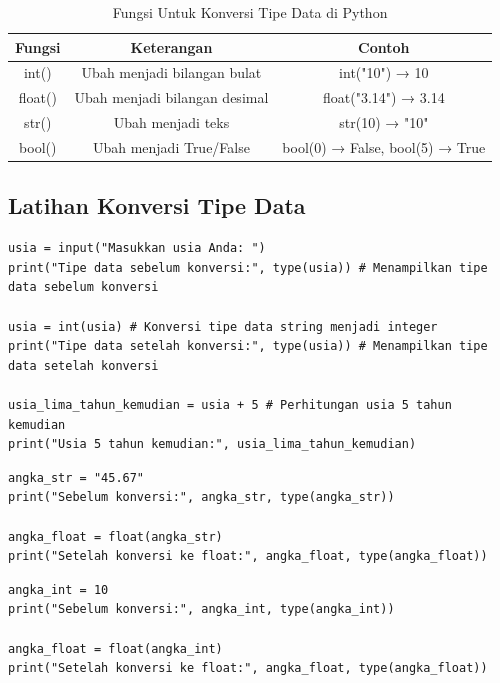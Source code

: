 \begin{table}[h!]
\centering
\begin{tabular}{|c|c|c|}
\hline
\textbf{Fungsi} & \textbf{Keterangan} & \textbf{Contoh} \\
\hline
int() & Ubah menjadi bilangan bulat & int("10") → 10 \\
\hline
float() & Ubah menjadi bilangan desimal & float("3.14") → 3.14 \\
\hline
str() & Ubah menjadi teks & str(10) → "10" \\
\hline
bool() & Ubah menjadi True/False & bool(0) → False, bool(5) → True \\
\hline
\end{tabular}
\caption{Fungsi Untuk Konversi Tipe Data di Python}
\end{table}

\subsection{Latihan Konversi Tipe Data}

\begin{lstlisting}[style=PythonStyle, caption={Kode Python: string_to_int.py}]
usia = input("Masukkan usia Anda: ")
print("Tipe data sebelum konversi:", type(usia)) # Menampilkan tipe data sebelum konversi

usia = int(usia) # Konversi tipe data string menjadi integer
print("Tipe data setelah konversi:", type(usia)) # Menampilkan tipe data setelah konversi

usia_lima_tahun_kemudian = usia + 5 # Perhitungan usia 5 tahun kemudian
print("Usia 5 tahun kemudian:", usia_lima_tahun_kemudian)
\end{lstlisting}

\begin{lstlisting}[style=PythonStyle, caption={Kode Python: string_to_float.py}]
angka_str = "45.67"
print("Sebelum konversi:", angka_str, type(angka_str))

angka_float = float(angka_str)
print("Setelah konversi ke float:", angka_float, type(angka_float))
\end{lstlisting}

\begin{lstlisting}[style=PythonStyle, caption={Kode Python: int_to_float.py}]
angka_int = 10
print("Sebelum konversi:", angka_int, type(angka_int))

angka_float = float(angka_int)
print("Setelah konversi ke float:", angka_float, type(angka_float))
\end{lstlisting}

